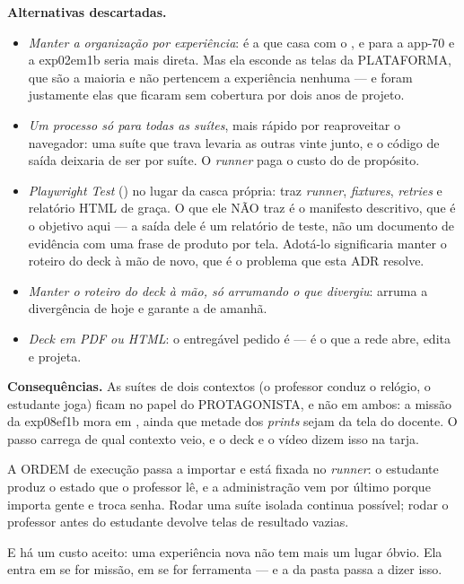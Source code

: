 \textbf{Alternativas descartadas.}
\begin{itemize}
  \item \emph{Manter a organização por experiência}: é a que casa com o
    , e para a app-70 e a exp02em1b seria mais direta. Mas
    ela esconde as telas da PLATAFORMA, que são a maioria e não pertencem a
    experiência nenhuma --- e foram justamente elas que ficaram sem cobertura
    por dois anos de projeto.
  \item \emph{Um processo só para todas as suítes}, mais rápido por reaproveitar
    o navegador: uma suíte que trava levaria as outras vinte junto, e o código
    de saída deixaria de ser por suíte. O \emph{runner} paga o custo do
     de propósito.
  \item \emph{Playwright Test} () no lugar da casca própria:
    traz \emph{runner}, \emph{fixtures}, \emph{retries} e relatório HTML de
    graça. O que ele NÃO traz é o manifesto descritivo, que é o objetivo aqui ---
    a saída dele é um relatório de teste, não um documento de evidência com uma
    frase de produto por tela. Adotá-lo significaria manter o roteiro do deck à
    mão de novo, que é o problema que esta ADR resolve.
  \item \emph{Manter o roteiro do deck à mão, só arrumando o que divergiu}:
    arruma a divergência de hoje e garante a de amanhã.
  \item \emph{Deck em PDF ou HTML}: o entregável pedido é  --- é o que
    a rede abre, edita e projeta.
\end{itemize}

\textbf{Consequências.} As suítes de dois contextos (o professor conduz o
relógio, o estudante joga) ficam no papel do PROTAGONISTA, e não em ambos: a
missão da exp08ef1b mora em , ainda que metade dos \emph{prints}
sejam da tela do docente. O passo carrega de qual contexto veio, e o deck e o
vídeo dizem isso na tarja.

A ORDEM de execução passa a importar e está fixada no \emph{runner}: o estudante
produz o estado que o professor lê, e a administração vem por último porque
importa gente e troca senha. Rodar uma suíte isolada continua possível; rodar o
professor antes do estudante devolve telas de resultado vazias.

E há um custo aceito: uma experiência nova não tem mais um lugar óbvio. Ela
entra em  se for missão, em  se for ferramenta
--- e a  da pasta  passa a dizer isso.

